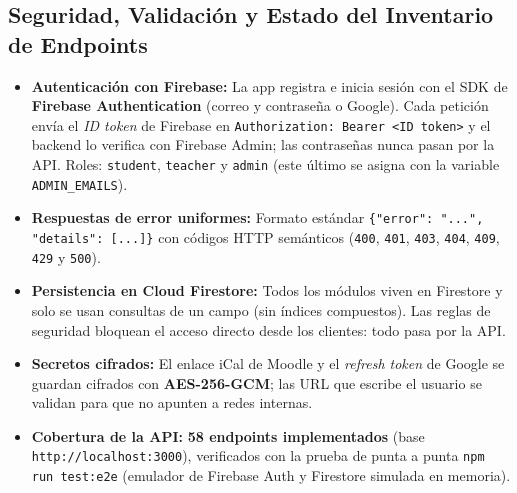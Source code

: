 \documentclass[11pt,letterpaper]{article}
\begin{document}
\subsection{Seguridad, Validación y Estado del Inventario de Endpoints}
\begin{itemize}[leftmargin=1.5em, itemsep=2pt]
  \item \textbf{Autenticación con Firebase:} La app registra e inicia sesión con el SDK de \textbf{Firebase Authentication} (correo y contraseña o Google). Cada petición envía el \emph{ID token} de Firebase en \texttt{Authorization: Bearer <ID token>} y el backend lo verifica con Firebase Admin; las contraseñas nunca pasan por la API. Roles: \texttt{student}, \texttt{teacher} y \texttt{admin} (este último se asigna con la variable \texttt{ADMIN\_EMAILS}).
  \item \textbf{Respuestas de error uniformes:} Formato estándar \texttt{\{"error": "...", "details": [...]\}} con códigos HTTP semánticos (\texttt{400}, \texttt{401}, \texttt{403}, \texttt{404}, \texttt{409}, \texttt{429} y \texttt{500}).
  \item \textbf{Persistencia en Cloud Firestore:} Todos los módulos viven en Firestore y solo se usan consultas de un campo (sin índices compuestos). Las reglas de seguridad bloquean el acceso directo desde los clientes: todo pasa por la API.
  \item \textbf{Secretos cifrados:} El enlace iCal de Moodle y el \emph{refresh token} de Google se guardan cifrados con \textbf{AES-256-GCM}; las URL que escribe el usuario se validan para que no apunten a redes internas.
  \item \textbf{Cobertura de la API:} \textbf{58 endpoints implementados} (base \texttt{http://localhost:3000}), verificados con la prueba de punta a punta \texttt{npm run test:e2e} (emulador de Firebase Auth y Firestore simulada en memoria).
\end{itemize}
\end{document}
